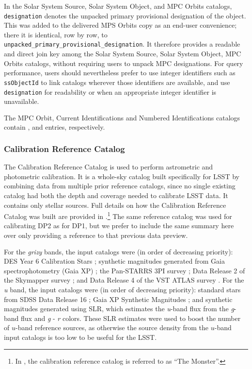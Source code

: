 In the Solar System Source, Solar System Object, and \gls{MPC} Orbits catalogs, \texttt{designation} denotes the unpacked primary provisional designation of the object.
This was added to the delivered \gls{MPS} Orbits copy as an end-user convenience; there it is identical, row by row, to \texttt{unpacked\_primary\_provisional\_designation}.
It therefore provides a readable and direct join key among the Solar System Source, Solar System Object, \gls{MPC} Orbits catalogs, without requiring users to unpack \gls{MPC} designations.
For query performance, users should nevertheless prefer to use integer identifiers such as \texttt{ssObjectId} to link catalogs wherever those identifiers are available, and use \texttt{designation} for readability or when an appropriate integer identifier is unavailable.

The MPC Orbit, Current Identifications and Numbered Identifications catalogs contain \nmpcorbits, \ncurrentidentifications and \nnumberedidentifications entries, respectively.

\subsubsection{Calibration Reference Catalog}
\label{sssec:referencecatalog}
The Calibration Reference Catalog is used to perform astrometric and photometric \gls{calibration}.
It is a whole-sky catalog built specifically for \gls{LSST} by combining data from multiple prior reference catalogs, since no single existing catalog had both the depth and coverage needed to calibrate \gls{LSST} data.
It contains only stellar sources.
Full details on how the Calibration Reference Catalog was built are provided in \citet[][]{DMTN-277}.\footnote{In \citet[][]{DMTN-277}, the calibration reference catalog is referred to as ``The Monster''.}
The same reference catalog was used for calibrating DP2 as for \gls{DP1}, but we prefer to include the same summary here over only providing a reference to that previous data preview.

For the \textit{grizy} bands, the input catalogs were (in order of decreasing priority): \gls{DES} Year 6 Calibration Stars \citep[][]{2023arXiv230501695R}; synthetic magnitudes generated from Gaia spectrophotometry (Gaia \gls{XP}) \citep[][]{2023A&A...674A..33G}; the \gls{Pan-STARRS} 3PI survey \citep[][]{2016arXiv161205560C}; Data Release 2 of the Skymapper survey \citep[][]{2019PASA...36...33O}; and Data Release 4 of the \gls{VST} \gls{ATLAS} survey \citep[][]{2015MNRAS.451.4238S}.
For the \textit{u} band, the input catalogs were (in order of decreasing priority): standard stars from \gls{SDSS} Data Release 16 \citep[][]{2020ApJS..249....3A}; Gaia \gls{XP} Synthetic Magnitudes \citep[][]{2023A&A...674A..33G}; and synthetic magnitudes generated using \gls{SLR}, which estimates the \textit{u}-band flux from the \textit{g}-band flux and \textit{g} - \textit{r} colors.
These \gls{SLR} estimates were used to boost the number of $u$-band reference sources, as otherwise the source density from the $u$-band input catalogs is too low to be useful for the \gls{LSST}.

